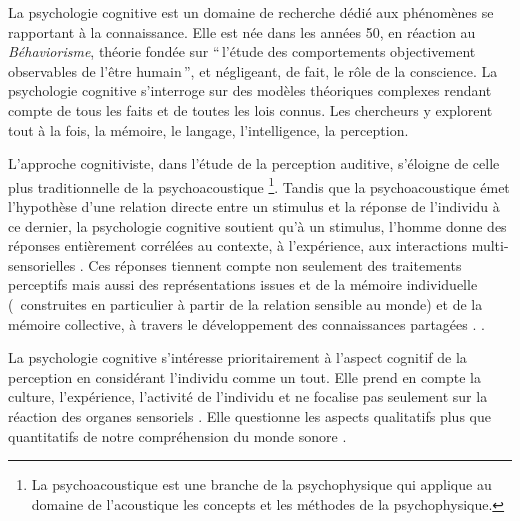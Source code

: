 La psychologie cognitive est un domaine de recherche dédié aux phénomènes se rapportant à la connaissance. Elle est née dans les années 50, en réaction au \emph{Béhaviorisme}, théorie fondée sur ``\,l'étude des comportements objectivement observables de l'être humain\,'', et négligeant, de fait, le rôle de la conscience. La psychologie cognitive s'interroge sur des modèles théoriques complexes rendant compte de tous les faits et de toutes les lois connus. Les chercheurs y explorent tout à la fois, la mémoire, le langage, l'intelligence, la perception.

L'approche cognitiviste, dans l'étude de la perception auditive, s'éloigne de celle plus traditionnelle de la psychoacoustique \footnote{La psychoacoustique est une branche de la psychophysique qui applique au domaine de l'acoustique les concepts et les méthodes de la psychophysique.}. Tandis que la psychoacoustique émet l'hypothèse d'une relation directe entre un stimulus et la réponse de l'individu à ce dernier, la psychologie cognitive soutient qu'à un stimulus, l'homme donne des réponses entièrement corrélées au contexte, à l'expérience, aux interactions multi-sensorielles \citep{maffiolo_marieParis_1997}. Ces réponses tiennent compte non seulement des traitements perceptifs mais aussi des représentations issues et de la mémoire individuelle (\ie~construites en particulier à partir de la relation sensible au monde) et de la mémoire collective, à travers le développement des connaissances partagées \citep[p. ??]{maffiolo_caracterisation_1999}.
.


La psychologie cognitive s'intéresse prioritairement à l'aspect cognitif de la perception en considérant l'individu comme un tout. Elle prend en compte la culture, l'expérience, l'activité de l'individu et ne focalise pas seulement sur la réaction des organes sensoriels . Elle questionne les aspects qualitatifs plus que quantitatifs de notre compréhension du monde sonore \citep[p. ??]{maffiolo_caracterisation_1999}.

